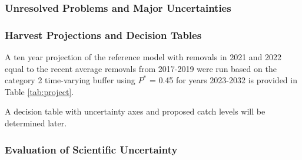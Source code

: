 \documentclass[11pt,
  english,
  a4paper,
]{article}
\begin{document}
\leavevmode\tagmcend\tagstructend\par


\hypertarget{unresolved-problems-and-major-uncertainties-1}{%
\subsubsection{Unresolved Problems and Major Uncertainties}\label{unresolved-problems-and-major-uncertainties-1}}

\leavevmode\tagmcend\tagstructend


\hypertarget{harvest-projections-and-decision-tables}{%
\subsubsection{Harvest Projections and Decision Tables}\label{harvest-projections-and-decision-tables}}

\leavevmode\tagmcend\tagstructend


A ten year projection of the reference model with removals in 2021 and 2022 equal to the recent average removals from 2017-2019 were run based on the category 2 time-varying buffer using {\(P^*\)\leavevmode\tagmcend\tagstructend} = 0.45 for years 2023-2032 is provided in Table \ref{tab:project}.

\leavevmode\tagmcend\tagstructend\par


A decision table with uncertainty axes and proposed catch levels will be determined later.

\leavevmode\tagmcend\tagstructend\par


\hypertarget{evaluation-of-scientific-uncertainty}{%
\subsubsection{Evaluation of Scientific Uncertainty}\label{evaluation-of-scientific-uncertainty}}

\leavevmode\tagmcend\tagstructend
\end{document}
